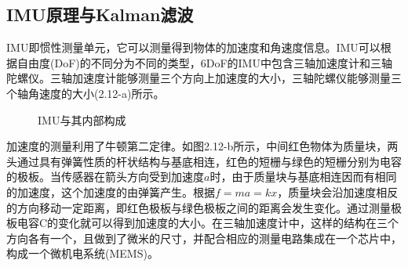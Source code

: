 \subsection{IMU原理与Kalman滤波}
IMU即惯性测量单元，它可以测量得到物体的加速度和角速度信息。IMU可以根据自由度(DoF)的不同分为不同的类型，6DoF的IMU中包含三轴加速度计和三轴陀螺仪。三轴加速度计能够测量三个方向上加速度的大小，三轴陀螺仪能够测量三个轴角速度的大小(2.12-a)所示。
\begin{figure}[htb]
    \caption{IMU与其内部构成}
    \label{fig:subfigss}
\end{figure}

加速度的测量利用了牛顿第二定律。如图2.12-b所示，中间红色物体为质量块，两头通过具有弹簧性质的杆状结构与基底相连，红色的短栅与绿色的短栅分别为电容的极板。当传感器在箭头方向受到加速度$a$时，由于质量块与基底相连因而有相同的加速度，这个加速度的由弹簧产生。根据$f=ma=kx$，质量块会沿加速度相反的方向移动一定距离，即红色极板与绿色极板之间的距离会发生变化。通过测量极板电容C的变化就可以得到加速度的大小。在三轴加速度计中，这样的结构在三个方向各有一个，且做到了微米的尺寸，并配合相应的测量电路集成在一个芯片中，构成一个微机电系统(MEMS)。

